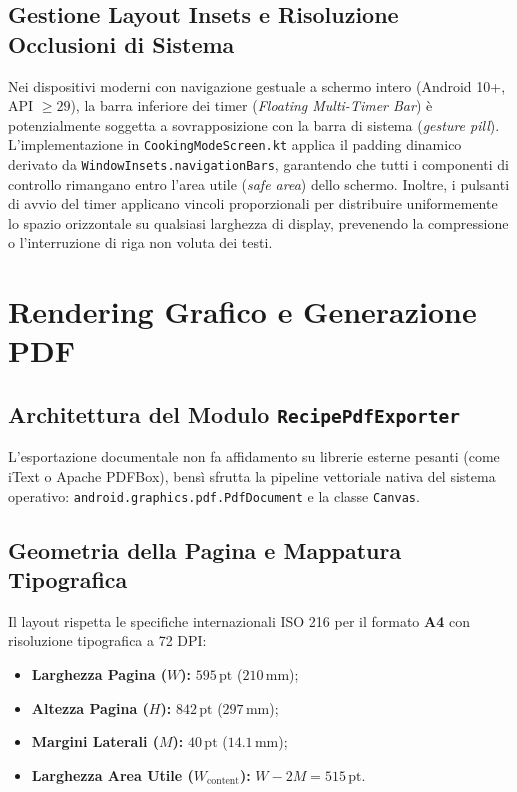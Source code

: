 \documentclass[11pt,a4paper,titlepage]{article}
\begin{document}
\subsection{Gestione Layout Insets e Risoluzione Occlusioni di Sistema}
Nei dispositivi moderni con navigazione gestuale a schermo intero (Android 10+, API $\ge 29$), la barra inferiore dei timer (\textit{Floating Multi-Timer Bar}) \`e potenzialmente soggetta a sovrapposizione con la barra di sistema (\textit{gesture pill}). L'implementazione in \texttt{CookingModeScreen.kt} applica il padding dinamico derivato da \texttt{WindowInsets.navigationBars}, garantendo che tutti i componenti di controllo rimangano entro l'area utile (\textit{safe area}) dello schermo. Inoltre, i pulsanti di avvio del timer applicano vincoli proporzionali per distribuire uniformemente lo spazio orizzontale su qualsiasi larghezza di display, prevenendo la compressione o l'interruzione di riga non voluta dei testi.

\newpage

\section{Rendering Grafico e Generazione PDF}
\subsection{Architettura del Modulo \texttt{RecipePdfExporter}}
L'esportazione documentale non fa affidamento su librerie esterne pesanti (come iText o Apache PDFBox), bens\`i sfrutta la pipeline vettoriale nativa del sistema operativo: 
\linebreak \texttt{android.graphics.pdf.PdfDocument} e la classe \texttt{Canvas}.

\subsection{Geometria della Pagina e Mappatura Tipografica}
Il layout rispetta le specifiche internazionali ISO 216 per il formato \textbf{A4} con risoluzione tipografica a 72 DPI:
\begin{itemize}[leftmargin=*]
    \item \textbf{Larghezza Pagina ($W$):} $595\,\text{pt}$ ($210\,\text{mm}$);
    \item \textbf{Altezza Pagina ($H$):} $842\,\text{pt}$ ($297\,\text{mm}$);
    \item \textbf{Margini Laterali ($M$):} $40\,\text{pt}$ ($14.1\,\text{mm}$);
    \item \textbf{Larghezza Area Utile ($W_{\text{content}}$):} $W - 2M = 515\,\text{pt}$.
\end{itemize}
\end{document}
